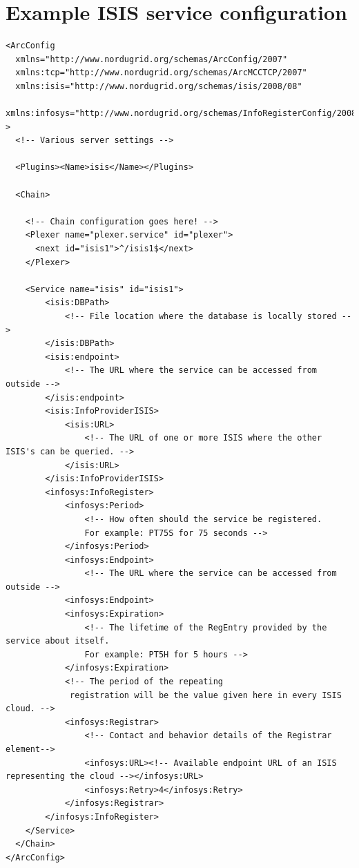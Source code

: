 \documentclass{book}
\begin{document}
\section{Example ISIS service configuration}
\label{annex:example_isis_configuration}
\begin{verbatim}
<ArcConfig
  xmlns="http://www.nordugrid.org/schemas/ArcConfig/2007"
  xmlns:tcp="http://www.nordugrid.org/schemas/ArcMCCTCP/2007"
  xmlns:isis="http://www.nordugrid.org/schemas/isis/2008/08"
  xmlns:infosys="http://www.nordugrid.org/schemas/InfoRegisterConfig/2008"
>
  <!-- Various server settings -->

  <Plugins><Name>isis</Name></Plugins>

  <Chain>

    <!-- Chain configuration goes here! -->
    <Plexer name="plexer.service" id="plexer">
      <next id="isis1">^/isis1$</next>
    </Plexer>

    <Service name="isis" id="isis1">
        <isis:DBPath>
            <!-- File location where the database is locally stored -->
        </isis:DBPath>
        <isis:endpoint>
            <!-- The URL where the service can be accessed from outside -->
        </isis:endpoint>
        <isis:InfoProviderISIS>
            <isis:URL>
                <!-- The URL of one or more ISIS where the other ISIS's can be queried. -->
            </isis:URL>
        </isis:InfoProviderISIS>
        <infosys:InfoRegister>
            <infosys:Period>
                <!-- How often should the service be registered. 
                For example: PT75S for 75 seconds -->
            </infosys:Period>
            <infosys:Endpoint>
                <!-- The URL where the service can be accessed from outside -->
            <infosys:Endpoint>
            <infosys:Expiration>
                <!-- The lifetime of the RegEntry provided by the service about itself.
                For example: PT5H for 5 hours -->
            </infosys:Expiration>
            <!-- The period of the repeating 
             registration will be the value given here in every ISIS cloud. -->
            <infosys:Registrar>
                <!-- Contact and behavior details of the Registrar element-->
                <infosys:URL><!-- Available endpoint URL of an ISIS representing the cloud --></infosys:URL>
                <infosys:Retry>4</infosys:Retry>        
            </infosys:Registrar>
        </infosys:InfoRegister>
    </Service>
  </Chain>
</ArcConfig>

\end{verbatim}




\end{document}
